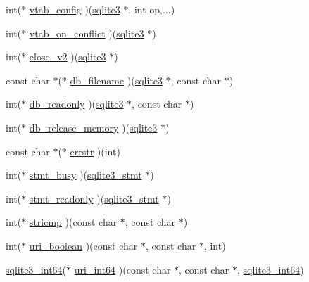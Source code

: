 \begin{DoxyCompactItemize}
\item 
int($\ast$ \hyperlink{structsqlite3__api__routines_ad6c9d2c982e53a0b65005b1d70b9eead}{vtab\+\_\+config} )(\hyperlink{sqlite3_8h_a0ef6f2646262c8a9b24368d8ac140f69}{sqlite3} $\ast$, int op,...)
\item 
int($\ast$ \hyperlink{structsqlite3__api__routines_a888c89ab06f21c953c7c27fdc00dd86c}{vtab\+\_\+on\+\_\+conflict} )(\hyperlink{sqlite3_8h_a0ef6f2646262c8a9b24368d8ac140f69}{sqlite3} $\ast$)
\item 
int($\ast$ \hyperlink{structsqlite3__api__routines_abb98b8486cbe7d739b8840d3d90baa30}{close\+\_\+v2} )(\hyperlink{sqlite3_8h_a0ef6f2646262c8a9b24368d8ac140f69}{sqlite3} $\ast$)
\item 
const char $\ast$($\ast$ \hyperlink{structsqlite3__api__routines_a100ccb514682b7eb4280ababd67e9831}{db\+\_\+filename} )(\hyperlink{sqlite3_8h_a0ef6f2646262c8a9b24368d8ac140f69}{sqlite3} $\ast$, const char $\ast$)
\item 
int($\ast$ \hyperlink{structsqlite3__api__routines_a192b2ee2b6bd5a57cbb74bf72266a9e7}{db\+\_\+readonly} )(\hyperlink{sqlite3_8h_a0ef6f2646262c8a9b24368d8ac140f69}{sqlite3} $\ast$, const char $\ast$)
\item 
int($\ast$ \hyperlink{structsqlite3__api__routines_a32bf57d7ff76e4153ca7fe2552bd168f}{db\+\_\+release\+\_\+memory} )(\hyperlink{sqlite3_8h_a0ef6f2646262c8a9b24368d8ac140f69}{sqlite3} $\ast$)
\item 
const char $\ast$($\ast$ \hyperlink{structsqlite3__api__routines_a853ce95bc126e615a9ba9b30de8fbb62}{errstr} )(int)
\item 
int($\ast$ \hyperlink{structsqlite3__api__routines_a046c107f8b417c85acc32a4d964aa913}{stmt\+\_\+busy} )(\hyperlink{sqlite3_8h_af2a033da1327cdd77f0a174a09aedd0c}{sqlite3\+\_\+stmt} $\ast$)
\item 
int($\ast$ \hyperlink{structsqlite3__api__routines_a04499bf64d666eb00fb19ae01cdbb8b1}{stmt\+\_\+readonly} )(\hyperlink{sqlite3_8h_af2a033da1327cdd77f0a174a09aedd0c}{sqlite3\+\_\+stmt} $\ast$)
\item 
int($\ast$ \hyperlink{structsqlite3__api__routines_aa6c2af28787384ae1f266ba2d7d97972}{stricmp} )(const char $\ast$, const char $\ast$)
\item 
int($\ast$ \hyperlink{structsqlite3__api__routines_ac0aebc3fb86e2537e04be6db52d4a395}{uri\+\_\+boolean} )(const char $\ast$, const char $\ast$, int)
\item 
\hyperlink{sqlite3_8h_a0a4d3e6c1ad46f90e746b920ab6ca0d2}{sqlite3\+\_\+int64}($\ast$ \hyperlink{structsqlite3__api__routines_a70dfce68b81e6c77b3e6c3d8e874c070}{uri\+\_\+int64} )(const char $\ast$, const char $\ast$, \hyperlink{sqlite3_8h_a0a4d3e6c1ad46f90e746b920ab6ca0d2}{sqlite3\+\_\+int64})

\end{DoxyCompactItemize}
